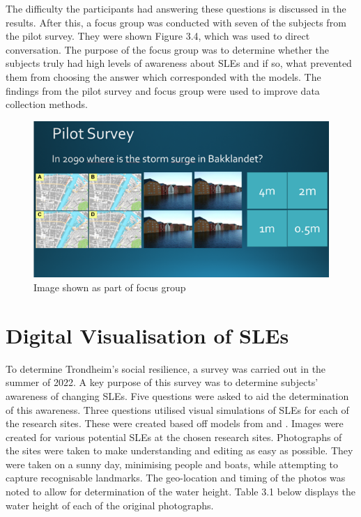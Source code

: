 The difficulty the participants had answering these questions is discussed in the results. After this, a focus group was conducted with seven of the subjects from the pilot survey.  They were shown Figure 3.4, which was used to direct conversation. The purpose of the focus group was to determine whether the subjects truly had high levels of awareness about SLEs and if so, what prevented them from choosing the answer which corresponded with the models. The findings from the pilot survey and focus group were used to improve data collection methods. 

\begin{figure}[H]
    \centering
    \includegraphics[width=1\textwidth]{fig_results/slide-pilot-survey.png}
    \caption{Image shown as part of focus group}
    \label{fig:slide}
\end{figure}

\section{Digital Visualisation of SLEs}
To determine Trondheim's social resilience, a survey was carried out in the summer of 2022. A key purpose of this survey was to determine subjects' awareness of changing SLEs.  Five questions were asked to aid the determination of this awareness. Three questions utilised visual simulations of SLEs for each of the research sites. These were created based off models from \cite{dsb_integrating-sea-level-rise-and-storm-surges--local-planningpdf_2017} and \cite{kartverket_se_2020}. Images were created for various potential SLEs at the chosen research sites. Photographs of the sites were taken to make understanding and editing as easy as possible. They were taken on a sunny day, minimising people and boats, while attempting to capture recognisable landmarks. The geo-location and timing of the photos was noted to allow for determination of the water height. Table 3.1 below displays the water height of each of the original photographs. 
